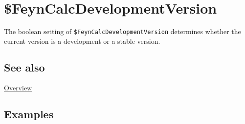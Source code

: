 \documentclass[../FeynCalcManual.tex]{subfiles}
\begin{document}
\hypertarget{feyncalcdevelopmentversion}{%
\section{\$FeynCalcDevelopmentVersion}\label{feyncalcdevelopmentversion}}

The boolean setting of \texttt{\$FeynCalcDevelopmentVersion} determines
whether the current version is a development or a stable version.

\subsection{See also}

\hyperlink{toc}{Overview}

\subsection{Examples}
\end{document}
